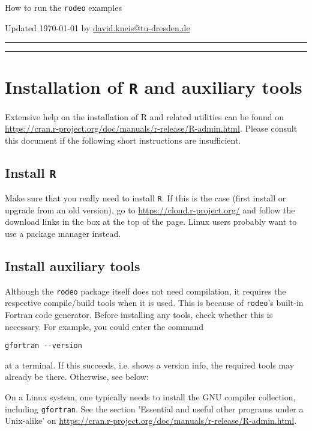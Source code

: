 \documentclass[10pt,a4paper]{article}
\author{dkneis}
\begin{document}
\newcommand{\software}[1]{\texttt{#1}}
\newcommand{\radmin}{\url{https://cran.r-project.org/doc/manuals/r-release/R-admin.html}}


{\LARGE How to run the \software{rodeo} examples}

\vspace{5mm}
Updated \today{} by \url{david.kneis@tu-dresden.de}

\vspace{5mm}
\hrule

\tableofcontents

\vspace{5mm}
\hrule

\section{Installation of \software{R} and auxiliary tools} \label{sec:install}

Extensive help on the installation of R and related utilities can be found on \radmin. Please consult this document if the following short instructions are insufficient.

\subsection{Install \software{R}}
Make sure that you really need to install \software{R}. If this is the case (first install or upgrade from an old version), go to \url{https://cloud.r-project.org/} and follow the download links in the box at the top of the page. Linux users probably want to use a package manager instead.

\subsection{Install auxiliary tools}
Although the \software{rodeo} package itself does not need compilation, it requires the respective compile/build tools when it is used. This is because of \software{rodeo}'s built-in Fortran code generator. Before installing any tools, check whether this is necessary. For example, you could enter the command

\begin{verbatim}
gfortran --version
\end{verbatim}

at a terminal. If this succeeds, i.e. shows a version info, the required tools may already be there. Otherwise, see below:

On a Linux system, one typically needs to install the GNU compiler collection, including \software{gfortran}. See the section 'Essential and useful other programs under a Unix-alike' on \radmin.
\end{document}
